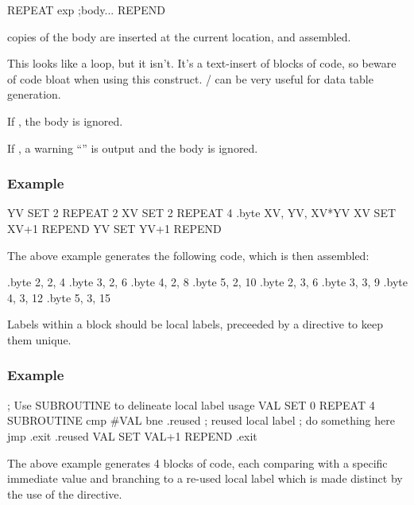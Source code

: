 \begin{usage}
  REPEAT exp
    ;body...
  REPEND
\end{usage}

 copies of the body are inserted at the current location, and assembled.

This looks like a loop, but it isn't. It's a text-insert of  blocks of code, so beware of code bloat when using this construct.  / can be very useful for data table generation.

If , the body is ignored.

If , a warning ``'' is output and the body is ignored.

\subsubsection{Example}

\begin{code}[caption=Data Generation Using Nested Repeat Loops]
YV  SET 2
    REPEAT 2
XV  SET 2
      REPEAT 4
        .byte XV, YV, XV*YV
XV  SET XV+1
      REPEND
YV  SET YV+1
    REPEND
\end{code}

The above example generates the following code, which is then assembled:

\begin{code}
 .byte 2, 2, 4
 .byte 3, 2, 6
 .byte 4, 2, 8
 .byte 5, 2, 10
 .byte 2, 3, 6
 .byte 3, 3, 9
 .byte 4, 3, 12
 .byte 5, 3, 15
\end{code}

Labels within a  block should be local labels, preceeded by a
 directive to keep them unique.

\subsubsection{Example}
\begin{code}
; Use SUBROUTINE to delineate local label usage
VAL SET 0
  REPEAT 4
  SUBROUTINE
    cmp #VAL
    bne .reused     ; reused local label
    ; do something here
    jmp .exit
.reused
VAL SET VAL+1
  REPEND    
.exit
\end{code}

The above example generates 4 blocks of code, each comparing with a specific immediate value and branching to a re-used local label which is made distinct by the use of the  directive.


